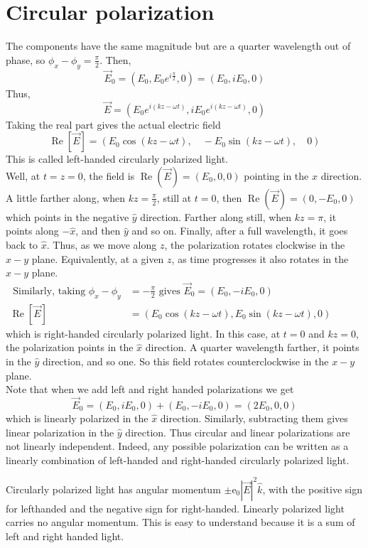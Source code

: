  \section{ Circular polarization}
 The components have the same magnitude but are a quarter wavelength out of phase, so $\phi_{x}-\phi_{y}=\frac{\pi}{2}$. Then,
 $$
 \vec{E}_{0}=\left(E_{0}, E_{0} e^{i \frac{\pi}{2}}, 0\right)=\left(E_{0}, i E_{0}, 0\right)
 $$
 Thus,
 $$
 \vec{E}=\left(E_{0} e^{i(k z-\omega t)}, i E_{0} e^{i(k z-\omega t)}, 0\right)
 $$
 Taking the real part gives the actual electric field
 $$
 \operatorname{Re}[\vec{E}]=\left(E_{0} \cos (k z-\omega t), \quad-E_{0} \sin (k z-\omega t), \quad 0\right)
 $$
 This is called left-handed circularly polarized light.\\
  Well, at $t=z=0$, the field is $\operatorname{Re}(\vec{E})=\left(E_{0}, 0,0\right)$ pointing in the $x$ direction. A little farther along, when $k z=\frac{\pi}{2}$, still at $t=0$, then $\operatorname{Re}(\vec{E})=\left(0,-E_{0}, 0\right)$ which points in the negative $\hat{y}$ direction. Farther along still, when $k z=\pi$, it points along $-\hat{x}$, and then $\hat{y}$ and so on. Finally, after a full wavelength, it goes back to $\hat{x}$. Thus, as we move along $z$, the polarization rotates clockwise in the $x-y$ plane. Equivalently, at a given $z$, as time progresses it also rotates in the $x-y$ plane.\\
 $\begin{aligned}
 	\text { Similarly, taking } \phi_{x}-\phi_{y} &=-\frac{\pi}{2} \text { gives } \vec{E}_{0}=\left(E_{0},-i E_{0}, 0\right) \\
 	\operatorname{Re}[\vec{E}] &=\left(E_{0} \cos (k z-\omega t), E_{0} \sin (k z-\omega t), 0\right)
 \end{aligned}$\\
 which is right-handed circularly polarized light. In this case, at $t=0$ and $k z=0$, the polarization points in the $\hat{x}$ direction. A quarter wavelength farther, it points in the $\hat{y}$ direction, and so one. So this field rotates counterclockwise in the $x-y$ plane.\\
 Note that when we add left and right handed polarizations we get
 $$
 \vec{E}_{0}=\left(E_{0}, i E_{0}, 0\right)+\left(E_{0},-i E_{0}, 0\right)=\left(2 E_{0}, 0,0\right)
 $$
 which is linearly polarized in the $\hat{x}$ direction. Similarly, subtracting them gives linear polarization in the $\hat{y}$ direction. Thus circular and linear polarizations are not linearly independent. Indeed, any possible polarization can be written as a linearly combination of left-handed and right-handed circularly polarized light.
 \begin{note}
 	Circularly polarized light has angular momentum $\pm \mathrm{e}_{0}|\vec{E}|^{2} \hat{k}$, with the positive sign for lefthanded and the negative sign for right-handed. Linearly polarized light carries no angular momentum. This is easy to understand because it is a sum of left and right handed light.
 \end{note}

